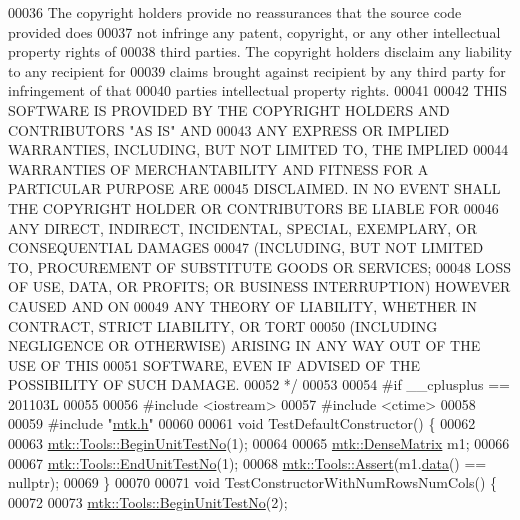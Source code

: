 \begin{DoxyCode}
00036 \textcolor{comment}{The copyright holders provide no reassurances that the source code provided does}
00037 \textcolor{comment}{not infringe any patent, copyright, or any other intellectual property rights of}
00038 \textcolor{comment}{third parties. The copyright holders disclaim any liability to any recipient for}
00039 \textcolor{comment}{claims brought against recipient by any third party for infringement of that}
00040 \textcolor{comment}{parties intellectual property rights.}
00041 \textcolor{comment}{}
00042 \textcolor{comment}{THIS SOFTWARE IS PROVIDED BY THE COPYRIGHT HOLDERS AND CONTRIBUTORS "AS IS" AND}
00043 \textcolor{comment}{ANY EXPRESS OR IMPLIED WARRANTIES, INCLUDING, BUT NOT LIMITED TO, THE IMPLIED}
00044 \textcolor{comment}{WARRANTIES OF MERCHANTABILITY AND FITNESS FOR A PARTICULAR PURPOSE ARE}
00045 \textcolor{comment}{DISCLAIMED. IN NO EVENT SHALL THE COPYRIGHT HOLDER OR CONTRIBUTORS BE LIABLE FOR}
00046 \textcolor{comment}{ANY DIRECT, INDIRECT, INCIDENTAL, SPECIAL, EXEMPLARY, OR CONSEQUENTIAL DAMAGES}
00047 \textcolor{comment}{(INCLUDING, BUT NOT LIMITED TO, PROCUREMENT OF SUBSTITUTE GOODS OR SERVICES;}
00048 \textcolor{comment}{LOSS OF USE, DATA, OR PROFITS; OR BUSINESS INTERRUPTION) HOWEVER CAUSED AND ON}
00049 \textcolor{comment}{ANY THEORY OF LIABILITY, WHETHER IN CONTRACT, STRICT LIABILITY, OR TORT}
00050 \textcolor{comment}{(INCLUDING NEGLIGENCE OR OTHERWISE) ARISING IN ANY WAY OUT OF THE USE OF THIS}
00051 \textcolor{comment}{SOFTWARE, EVEN IF ADVISED OF THE POSSIBILITY OF SUCH DAMAGE.}
00052 \textcolor{comment}{*/}
00053 
00054 \textcolor{preprocessor}{#if \_\_cplusplus == 201103L}
00055 
00056 \textcolor{preprocessor}{#include <iostream>}
00057 \textcolor{preprocessor}{#include <ctime>}
00058 
00059 \textcolor{preprocessor}{#include "\hyperlink{mtk_8h}{mtk.h}"}
00060 
00061 \textcolor{keywordtype}{void} TestDefaultConstructor() \{
00062 
00063   \hyperlink{classmtk_1_1Tools_afc29ecaf337a13ed2e817d3890a5a441}{mtk::Tools::BeginUnitTestNo}(1);
00064 
00065   \hyperlink{classmtk_1_1DenseMatrix}{mtk::DenseMatrix} m1;
00066 
00067   \hyperlink{classmtk_1_1Tools_aba67d9dc35c9c1c49430fcc9ea035e03}{mtk::Tools::EndUnitTestNo}(1);
00068   \hyperlink{classmtk_1_1Tools_ac6804df469c94ab6a796fb64f1e44a89}{mtk::Tools::Assert}(m1.\hyperlink{classmtk_1_1DenseMatrix_a0c33b8a9e01d157c61ddbdf807c25d84}{data}() == \textcolor{keyword}{nullptr});
00069 \}
00070 
00071 \textcolor{keywordtype}{void} TestConstructorWithNumRowsNumCols() \{
00072 
00073   \hyperlink{classmtk_1_1Tools_afc29ecaf337a13ed2e817d3890a5a441}{mtk::Tools::BeginUnitTestNo}(2);

\end{DoxyCode}
